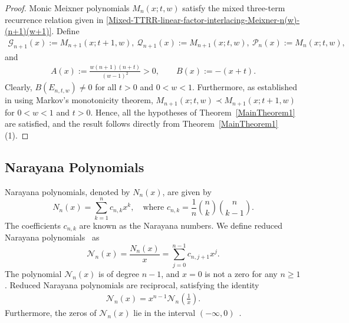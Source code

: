 \documentclass[final,3p,times,12pt]{elsarticle}
\numberwithin{equation}{section}  %
\begin{document}
\begin{proof}
	Monic Meixner polynomials $M_n(x; t, w)$ satisfy the mixed three-term recurrence 
	relation given in \eqref{Mixed-TTRR-linear-factor-interlacing-Meixner-n(w)-(n+1)(w+1)}.	Define
	\begin{align}
		\mathcal{G}_{n+1}(x):=M_{n+1}(x; t+1, w), ~
		\mathcal{Q}_{n+1}(x):=M_{n+1}(x; t, w), ~
		\mathcal{P}_n(x):=M_n(x; t, w),
	\end{align}and 
	\begin{align}
		A(x):=\frac{w(n+1)(n+t)}{(w-1)^2}>0, \qquad 
		B(x):=-(x+t).
	\end{align}
	Clearly, $B(E_{n,t,w})\neq 0$ for all $ t >0$ and $0<w<1$.
	Furthermore, as established in \cite[Corollary 2.2]{Jordaan-Tookos-ANM-2009} using Markov's monotonicity theorem, $M_{n+1}(x; t, w) \prec M_{n+1}(x; t+1, w)$ for $0 < w < 1$ and $t > 0$.
	Hence, all the hypotheses of Theorem~\ref{MainTheorem1} are satisfied, 
	and the result follows directly from Theorem~\ref{MainTheorem1}(1).
\end{proof}

\subsection{Narayana Polynomials}\label{Examples Naryana}
Narayana polynomials, denoted by $N_n(x)$, are given by \cite{Kostov-Finkelshtein-Shapiro-NarayanaNumbers-JAT-2009,Liu-Wang-Unified}
\begin{equation}
	N_n(x) = \sum_{k=1}^n c_{n,k} x^k, \quad \text{where } c_{n,k} = \frac{1}{n}\binom{n}{k}\binom{n}{k-1}.
\end{equation}
The coefficients $c_{n,k}$ are known as the Narayana numbers. We define reduced Narayana polynomials~\cite{Kostov-Finkelshtein-Shapiro-NarayanaNumbers-JAT-2009} as
\begin{equation}
	\mathcal{N}_n(x) = \frac{N_n(x)}{x} = \sum_{j=0}^{n-1}c_{n, j+1} x^j.
\end{equation}
The polynomial $\mathcal{N}_n(x)$ is of degree $n-1$, and $x=0$ is not a zero for any $n\geq1$. Reduced Narayana polynomials are reciprocal, satisfying the identity 
\begin{align}\label{reciprocal-identity-ReducedNarayana}
	\mathcal{N}_n(x) = x^{n-1}\mathcal{N}_n\left(\frac{1}{x}\right). 
\end{align}
Furthermore, the zeros of $\mathcal{N}_n(x)$ lie in the interval $(-\infty,0)$~\cite[Corollary 7]{Kostov-Finkelshtein-Shapiro-NarayanaNumbers-JAT-2009}.
\end{document}
